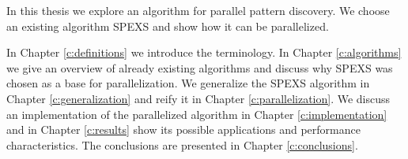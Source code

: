 In this thesis we explore an algorithm for parallel pattern discovery. We choose an existing algorithm SPEXS\cite{spexs} and show how it can be parallelized.

In Chapter \ref{c:definitions} we introduce the terminology. In Chapter \ref{c:algorithms} we give an overview of already existing algorithms and discuss why SPEXS\cite{spexs} was chosen as a base for parallelization. We generalize the SPEXS algorithm in Chapter \ref{c:generalization} and reify it in Chapter \ref{c:parallelization}. We discuss an implementation of the parallelized algorithm in Chapter \ref{c:implementation} and in Chapter \ref{c:results} show its possible applications and performance characteristics. The conclusions are presented in Chapter \ref{c:conclusions}.
